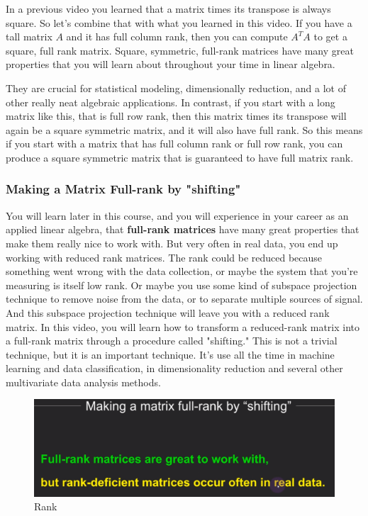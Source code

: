 \documentclass[fleqn,10pt]{olplainarticle}
\theoremstyle{definition}
\theoremstyle{remark}
\begin{document}
In a previous video you learned that a matrix times its transpose is always square. So let's combine that with what you learned in this video. If you have a tall matrix $A$ and it has full column rank, then you can compute $A^TA$ to get a square, full rank matrix. Square, symmetric, full-rank matrices have many great properties that you will learn about throughout your time in linear algebra.

They are crucial for statistical modeling, dimensionally reduction, and a lot of other really neat algebraic applications. In contrast, if you start with a long matrix like this, that is full row rank, then this matrix times its transpose will again be a square symmetric matrix, and it will also have full rank. So this means if you start with a matrix that has full column rank or full row rank, you can produce a square symmetric matrix that is guaranteed to have full matrix rank.

\pagebreak

\subsubsection*{Making a Matrix Full-rank by "shifting"}

You will learn later in this course, and you will experience in your career as an applied linear algebra, that \textbf{full-rank matrices} have many great properties that make them really nice to work with. But very often in real data, you end up working with reduced rank matrices. The rank could be reduced because something went wrong with the data collection, or maybe the system that you're measuring is itself low rank. Or maybe you use some kind of subspace projection technique to remove noise from the data, or to separate multiple sources of signal. And this subspace projection technique will leave you with a reduced rank matrix. In this video, you will learn how to transform a reduced-rank matrix into a full-rank matrix through a procedure called "shifting." This is not a trivial technique, but it is an important technique. It's use all the time in machine learning and data classification, in dimensionality reduction and several other multivariate data analysis methods.

\begin{figure}[ht]
	\centering
	\includegraphics[width=0.5\linewidth]{images/rank-28.png}
	\caption{Rank}
	\label{fig:rank_28}
\end{figure}
\end{document}
